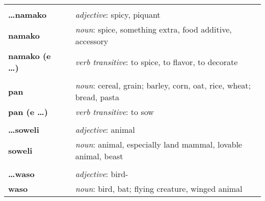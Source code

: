 \begin{supertabular}{p{2,5cm}|ll}
                              &  &                                                                                                   \\ %
    \textbf{\dots namako}     &  & \textit{adjective}: spicy, piquant                                                                \\
    \textbf{namako}           &  & \textit{noun}: spice, something extra, food additive, accessory                                   \\ %
    \textbf{namako (e \dots)} &  & \textit{verb transitive}: to spice, to flavor, to decorate                                        \\ %
                              &  &                                                                                                   \\ %
    \textbf{pan}              &  & \textit{noun}: cereal, grain; barley, corn, oat, rice, wheat; bread, pasta                        \\ %
    \textbf{pan (e \dots)}    &  & \textit{verb transitive}: to sow                                                                  \\ %
                              &  &                                                                                                   \\ %
    \textbf{\dots soweli}     &  & \textit{adjective}: animal                                                                        \\ %
    \textbf{soweli}           &  & \textit{noun}: animal, especially land mammal, lovable animal, beast                              \\ %
                              &  &                                                                                                   \\ %
    \textbf{\dots waso}       &  & \textit{adjective}: bird-                                                                         \\ %
    \textbf{waso}             &  & \textit{noun}: bird, bat; flying creature, winged animal                                          \\ %
\end{supertabular} \\
%
%
%
\newpage
%
